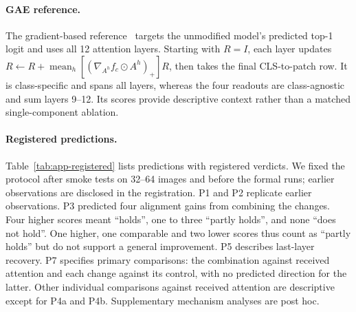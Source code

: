 \paragraph{GAE reference.} The gradient-based reference~\citep{chefer2021generic} targets the unmodified model's predicted top-1 logit and uses all 12 attention layers. Starting with $R=I$, each layer updates $R\leftarrow R+\operatorname{mean}_h[(\nabla_{A^h}f_c\odot A^h)_+]R$, then takes the final CLS-to-patch row. It is class-specific and spans all layers, whereas the four readouts are class-agnostic and sum layers 9--12. Its scores provide descriptive context rather than a matched single-component ablation.

\paragraph{Registered predictions.} Table~\ref{tab:app-registered} lists predictions with registered verdicts. We fixed the protocol after smoke tests on 32--64 images and before the formal runs; earlier observations are disclosed in the registration. P1 and P2 replicate earlier observations. P3 predicted four alignment gains from combining the changes. Four higher scores meant ``holds'', one to three ``partly holds'', and none ``does not hold''. One higher, one comparable and two lower scores thus count as ``partly holds'' but do not support a general improvement. P5 describes last-layer recovery. P7 specifies primary comparisons: the combination against received attention and each change against its control, with no predicted direction for the latter. Other individual comparisons against received attention are descriptive except for P4a and P4b. Supplementary mechanism analyses are post hoc.

